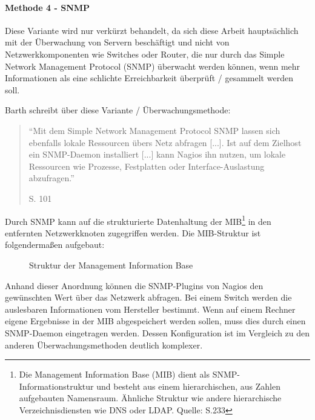 \paragraph{Methode 4 - SNMP}

Diese Variante wird nur verkürzt behandelt, da sich diese Arbeit hauptsächlich mit der Überwachung von Servern beschäftigt und nicht von Netzwerkkomponenten wie Switches oder Router, die nur durch das Simple Network Management Protocol (\gls{SNMP}) überwacht werden können, wenn mehr Informationen als eine schlichte Erreichbarkeit überprüft / gesammelt werden soll.

Barth schreibt über diese Variante / Überwachungsmethode:
\begin{quote}"`Mit dem Simple Network Management Protocol \gls{SNMP} lassen sich ebenfalls lokale Ressourcen übers Netz abfragen [...]. Ist auf dem Zielhost ein \gls{SNMP}-Daemon installiert [...] kann Nagios ihn nutzen, um lokale Ressourcen wie Prozesse, Festplatten oder Interface-Auslastung abzufragen."' \begin{flushright}\cite{Barth08} S. 101\end{flushright}\end{quote} 

Durch \gls{SNMP} kann auf die strukturierte Datenhaltung der \gls{MIB}\footnote{Die Management Information Base (\gls{MIB}) dient als \gls{SNMP}-Informationstruktur und besteht aus einem hierarchischen, aus Zahlen aufgebauten Namensraum. Ähnliche Struktur wie andere hierarchische Verzeichnisdiensten wie \gls{DNS} oder \gls{LDAP}. Quelle: \cite{Barth08} S.233} in den entfernten Netzwerkknoten zugegriffen werden.
Die \gls{MIB}-Struktur ist folgendermaßen aufgebaut:

\begin{figure}[ht]
	\centering
		\caption[Struktur der Management Information Base]{Struktur der Management Information Base\protect\footnotemark}
		\label{munin-mib}
\end{figure}
Anhand dieser Anordnung können die \gls{SNMP}-Plugins von Nagios den gewünschten Wert über das Netzwerk abfragen.
Bei einem Switch werden die auslesbaren Informationen vom Hersteller bestimmt.
Wenn auf einem Rechner eigene Ergebnisse in der \gls{MIB} abgespeichert werden sollen, muss dies durch einen \gls{SNMP}-Daemon eingetragen werden.
Dessen Konfiguration ist im Vergleich zu den anderen Überwachungsmethoden deutlich komplexer.

